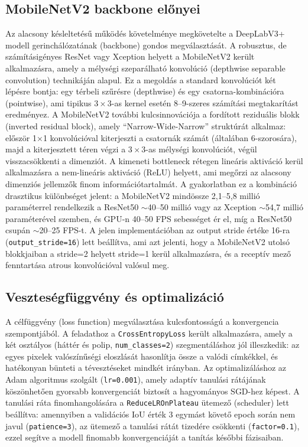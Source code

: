 \documentclass[12pt, a4paper]{report}
\begin{document}
\subsection{MobileNetV2 backbone előnyei}
Az alacsony késleltetésű működés követelménye megkövetelte a DeepLabV3+ modell gerinchálózatának (backbone) gondos megválasztását. A robusztus, de számításigényes ResNet vagy Xception helyett a MobileNetV2 \cite{mobilenetv2} került alkalmazásra, amely a mélységi szeparálható konvolúció (depthwise separable convolution) technikáján alapul. Ez a megoldás a standard konvolúciót két lépésre bontja: egy térbeli szűrésre (depthwise) és egy csatorna-kombinációra (pointwise), ami tipikus $3 \times 3$-as kernel esetén 8--9-szeres számítási megtakarítást eredményez. A MobileNetV2 további kulcsinnovációja a fordított reziduális blokk (inverted residual block), amely ``Narrow-Wide-Narrow'' struktúrát alkalmaz: először 1$\times$1 konvolúcióval kiterjeszti a csatornák számát (általában 6-szorosára), majd a kiterjesztett téren végzi a $3 \times 3$-as mélységi konvolúciót, végül visszacsökkenti a dimenziót. A kimeneti bottleneck rétegen lineáris aktiváció kerül alkalmazásra a nem-lineáris aktiváció (ReLU) helyett, ami megőrzi az alacsony dimenziós jellemzők finom információtartalmát. A gyakorlatban ez a kombináció drasztikus különbséget jelent: a MobileNetV2 mindössze 2,1--5,8 millió paraméterrel rendelkezik a ResNet50 $\sim$40--50 millió vagy az Xception $\sim$54,7 millió paraméterével szemben, és GPU-n 40--50 FPS sebességet ér el, míg a ResNet50 csupán $\sim$20--25 FPS-t. A jelen implementációban az output stride értéke 16-ra (\texttt{output\_stride=16}) lett beállítva, ami azt jelenti, hogy a MobileNetV2 utolsó blokkjaiban a stride=2 helyett stride=1 kerül alkalmazásra, és a receptív mező fenntartása atrous konvolúcióval valósul meg.

\subsection{Veszteségfüggvény és optimalizáció}
A célfüggvény (loss function) megválasztása kulcsfontosságú a konvergencia szempontjából. A feladathoz a \texttt{CrossEntropyLoss} került alkalmazásra, amely a két osztályos (háttér és polip, \texttt{num\_classes=2}) szegmentáláshoz jól illeszkedik: az egyes pixelek valószínűségi eloszlását hasonlítja össze a valódi címkékkel, és hatékonyan bünteti a tévesztéseket mindkét irányban. Az optimalizáláshoz az Adam algoritmus szolgált (\texttt{lr=0.001}), amely adaptív tanulási rátájának köszönhetően gyorsabb konvergenciát biztosít a hagyományos SGD-hez képest. A tanulási ráta finomhangolására a \texttt{ReduceLROnPlateau} ütemező (scheduler) lett beállítva: amennyiben a validációs IoU érték 3 egymást követő epoch során nem javul (\texttt{patience=3}), az ütemező a tanulási rátát tizedére csökkenti (\texttt{factor=0.1}), ezzel segítve a modell finomabb konvergenciáját a tanítás későbbi fázisaiban.
\end{document}
